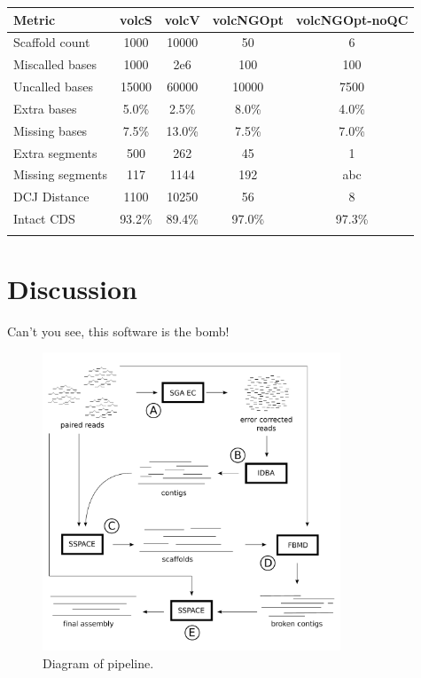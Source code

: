 \documentclass{bioinfo}
\begin{document}
\begin{table}[!t]
{\begin{tabular}{l|cccc}\toprule
Metric & volcS & volcV & volcNGOpt & volcNGOpt-noQC\\\midrule
Scaffold count & 1000 & 10000 & 50  & 6 \\
Miscalled bases & 1000 & 2e6 & 100 & 100 \\
Uncalled bases & 15000 & 60000 & 10000 & 7500 \\
Extra bases & 5.0\% & 2.5\% & 8.0\% & 4.0\% \\
Missing bases & 7.5\% & 13.0\% & 7.5\% & 7.0\% \\
Extra segments & 500 & 262 & 45 & 1 \\
Missing segments & 117 & 1144 & 192 & abc \\
DCJ Distance & 1100 & 10250 & 56 & 8 \\
Intact CDS & 93.2\% & 89.4\% & 97.0\% & 97.3\% \\
\botrule \\
\end{tabular}}{}
\end{table}



\section{Discussion}

Can't you see, this software is the bomb!

\begin{figure}[t]
\includegraphics[width=3.5in]{a5pipeline-diagram.pdf}
\vspace{-1cm}
\caption{Diagram of pipeline. }\label{fig:01}
\end{figure}
\end{document}
